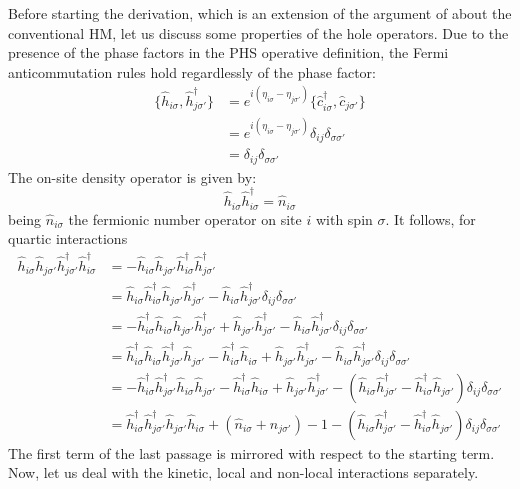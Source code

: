 Before starting the derivation, which is an extension of the argument of \citeauthor{arovas2022hubbard} \cite{arovas2022hubbard} about the conventional HM, let us discuss some properties of the hole operators. Due to the presence of the phase factors in the PHS operative definition, the Fermi anticommutation rules hold regardlessly of the phase factor:
\[
\begin{aligned}
	\lbrace \hat h_{i\sigma}, \hat h_{j\sigma'}^\dagger \rbrace &= e^{i(\eta_{i\sigma}-\eta_{j\sigma'})} \lbrace \hat c_{i\sigma}^\dagger, \hat c_{j\sigma'} \rbrace \\
	&= e^{i(\eta_{i\sigma}-\eta_{j\sigma'})} \delta_{ij} \delta_{\sigma\sigma'} \\
	&= \delta_{ij} \delta_{\sigma\sigma'}
\end{aligned}
\]
The on-site density operator is given by:
\[
	\hat h_{i\sigma} \hat h_{i\sigma}^\dagger = \hat n_{i\sigma}
\]
being $\hat n_{i\sigma}$ the fermionic number operator on site $i$ with spin $\sigma$. It follows, for quartic interactions
\begin{align}
	\hat h_{i\sigma} \hat h_{j\sigma'} \hat h_{j\sigma'}^\dagger \hat h_{i\sigma}^\dagger &= -\hat h_{i\sigma} \hat h_{j\sigma'} \hat h_{i\sigma}^\dagger \hat h_{j\sigma'}^\dagger \nonumber \\
	&= \hat h_{i\sigma} \hat h_{i\sigma}^\dagger \hat h_{j\sigma'} \hat h_{j\sigma'}^\dagger - \hat h_{i\sigma} \hat h_{j\sigma'}^\dagger \delta_{ij}\delta_{\sigma\sigma'} \nonumber \\
	&= - \hat h_{i\sigma}^\dagger \hat h_{i\sigma} \hat h_{j\sigma'} \hat h_{j\sigma'}^\dagger + \hat h_{j\sigma'} \hat h_{j\sigma'}^\dagger - \hat h_{i\sigma} \hat h_{j\sigma'}^\dagger \delta_{ij}\delta_{\sigma\sigma'} \nonumber \\
	&= \hat h_{i\sigma}^\dagger \hat h_{i\sigma} \hat h_{j\sigma'}^\dagger \hat h_{j\sigma'} - \hat h_{i\sigma}^\dagger \hat h_{i\sigma} + \hat h_{j\sigma'} \hat h_{j\sigma'}^\dagger - \hat h_{i\sigma} \hat h_{j\sigma'}^\dagger \delta_{ij}\delta_{\sigma\sigma'} \nonumber \\
	&= - \hat h_{i\sigma}^\dagger \hat h_{j\sigma'}^\dagger \hat h_{i\sigma} \hat h_{j\sigma'} - \hat h_{i\sigma}^\dagger \hat h_{i\sigma} + \hat h_{j\sigma'} \hat h_{j\sigma'}^\dagger - \left(
		\hat h_{i\sigma} \hat h_{j\sigma'}^\dagger - \hat h_{i\sigma}^\dagger \hat h_{j\sigma'}
	\right) \delta_{ij}\delta_{\sigma\sigma'} \nonumber \\
	&= \hat h_{i\sigma}^\dagger \hat h_{j\sigma'}^\dagger \hat h_{j\sigma'} \hat h_{i\sigma} + \left(
		\hat n_{i\sigma} + \hat n_{j\sigma'}
	\right) - 1 - \left(
		\hat h_{i\sigma} \hat h_{j\sigma'}^\dagger - \hat h_{i\sigma}^\dagger \hat h_{j\sigma'}
	\right) \delta_{ij}\delta_{\sigma\sigma'} \label{eq:phs-hhhh-chain}
\end{align}
The first term of the last passage is mirrored with respect to the starting term. Now, let us deal with the kinetic, local and non-local interactions separately.

